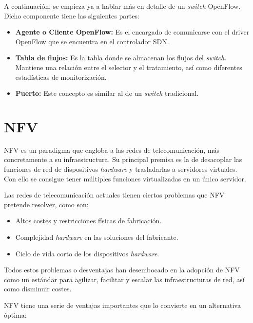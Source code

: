 A continuación, se empieza ya a hablar más en detalle de un \textit{switch} OpenFlow. Dicho componente tiene las siguientes partes:

\begin{itemize}
	\item \textbf{Agente o Cliente OpenFlow:} Es el encargado de comunicarse con el driver OpenFlow que se encuentra en el controlador \ac{SDN}.
	
	\item \textbf{Tabla de flujos:} Es la tabla donde se almacenan los flujos del \textit{switch}. Mantiene una relación entre el selector y el tratamiento, así como diferentes estadísticas de monitorización.
	
	\item \textbf{Puerto:} Este concepto es similar al de un \textit{switch} tradicional.
\end{itemize}

\section{NFV}
\label{sec:nfv}

\ac{NFV} es un paradigma que engloba a las redes de telecomunicación, más concretamente a su infraestructura. Su principal premisa es la de desacoplar las funciones de red de dispositivos \textit{hardware} y trasladarlas a servidores virtuales. Con ello se consigue tener múltiples funciones virtualizadas en un único servidor.\cite{nfvbib}

Las redes de telecomunicación actuales tienen ciertos problemas que \ac{NFV} pretende resolver, como son:

\begin{itemize}
	\item Altos costes y restricciones físicas de fabricación.
	\item Complejidad \textit{hardware} en las soluciones del fabricante.
	\item Ciclo de vida corto de los dispositivos \textit{hardware}.
\end{itemize}

Todos estos problemas o desventajas han desembocado en la adopción de \ac{NFV} como un estándar para agilizar, facilitar y escalar las infraestructuras de red, así como disminuir costes.

\ac{NFV} tiene una serie de ventajas importantes que lo convierte en un alternativa óptima:

